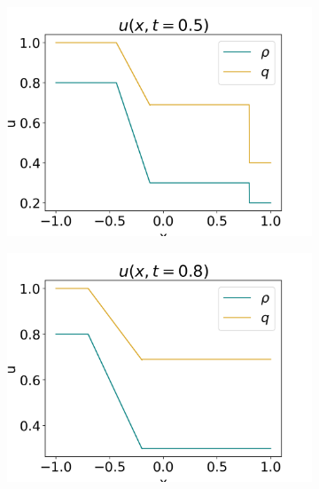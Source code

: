 \documentclass[10pt]{article}
\numberwithin{equation}{section}
\begin{document}
\begin{figure}
\begin{subfigure}[t]{0.2\textwidth}
         \centering
         \includegraphics[width=\textwidth]{Figures/Model/Plots/SysRarefacAtTime5.png}
     \end{subfigure}
     \begin{subfigure}[t]{0.2\textwidth}
         \centering
         \includegraphics[width=\textwidth]{Figures/Model/Plots/SysRarefacAtTime8.png}
     \end{subfigure}
     \\
     \begin{subfigure}[b]{0.35\textwidth}
         \centering

\end{subfigure}
\end{figure}
\end{document}
